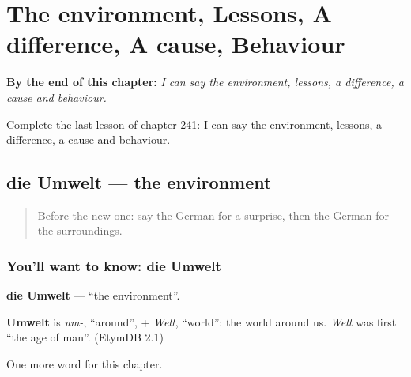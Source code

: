 
\chapter{The environment, Lessons, A difference, A cause, Behaviour}
\label{ch:ge-the-environment-lessons-a-difference-a-cause-behaviour}

\begin{chapteropening}
\textbf{By the end of this chapter:} \emph{I can say the environment, lessons, a difference, a cause and behaviour.}

Complete the last lesson of chapter 241: I can say the environment, lessons, a difference, a cause and behaviour.
\end{chapteropening}

\section[die Umwelt]{die Umwelt — the environment}

\label{lesson:GE-C241-umwelt}



\begin{quote}
Before the new one: say the German for a surprise, then the German for the surroundings.
\end{quote}

\subsection*{You'll want to know: die Umwelt}
\textbf{die Umwelt} — \textquotedblleft{}the environment\textquotedblright{}.

\begin{cousinweb}
\textbf{Umwelt} is \emph{um-}, \textquotedblleft{}around\textquotedblright{}, + \emph{Welt}, \textquotedblleft{}world\textquotedblright{}: the world around us. \emph{Welt} was first \textquotedblleft{}the age of man\textquotedblright{}. (EtymDB 2.1)
\end{cousinweb}

\begin{grammarlens}[title={What you've built}]
One more word for this chapter.
\end{grammarlens}

